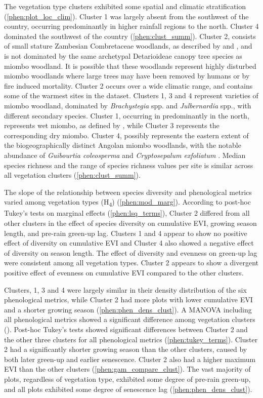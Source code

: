 \begin{refsection}
The \numberstringnum{\nCluster} vegetation type clusters exhibited some spatial and climatic stratification (\autoref{phen:plot_loc_clim}). Cluster 1 was largely absent from the southwest of the country, occurring predominantly in higher rainfall regions to the north. Cluster 4 dominated the southwest of the country (\autoref{phen:clust_summ}). Cluster 2, consists of small stature Zambesian Combretaceae woodlands, as described by \citet{Dinerstein2017} and \citet{Chidumayo2001}, and is not dominated by the same archetypal Detarioideae canopy tree species as miombo woodland. It is possible that these woodlands represent highly disturbed miombo woodlands where large trees may have been removed by humans or by fire induced mortality. Cluster 2 occurs over a wide climatic range, and contains some of the warmest sites in the dataset. Clusters 1, 3 and 4 represent varieties of miombo woodland, dominated by \textit{Brachystegia} spp. and \textit{Julbernardia} spp., with different secondary species. Cluster 1, occurring in predominantly in the north, represents wet miombo, as defined by \citet{White1983}, while Cluster 3 represents the corresponding dry miombo. Cluster 4, possibly represents the eastern extent of the biogeographically distinct Angolan miombo woodlands, with the notable abundance of \textit{Guibourtia coleosperma} and \textit{Cryptosepalum exfoliatum} \citep{Huntley1994}. Median species richness and the range of species richness values per site is similar across all vegetation clusters (\autoref{phen:clust_summ}). 

The slope of the relationship between species diversity and phenological metrics varied among vegetation types (H\textsubscript{4}) (\autoref{phen:mod_marg}). According to post-hoc Tukey's tests on marginal effects (\autoref{phen:lsq_terms}), Cluster 2 differed from all other clusters in the effect of species diversity on cumulative EVI, growing season length, and pre-rain green-up lag. Clusters 1 and 4 appear to show no positive effect of diversity on cumulative EVI and Cluster 4 also showed a negative effect of diversity on season length. The effect of diversity and evenness on green-up lag were consistent among all vegetation types. Cluster 2 appears to show a divergent positive effect of evenness on cumulative EVI compared to the other clusters. 
 
Clusters, 1, 3 and 4 were largely similar in their density distribution of the six phenological metrics, while Cluster 2 had more plots with lower cumulative EVI and a shorter growing season (\autoref{phen:phen_dens_clust}). A MANOVA including all phenological metrics showed a significant difference among vegetation clusters (\phenManova{}). Post-hoc Tukey's tests showed significant differences between Cluster 2 and the other three clusters for all phenological metrics (\autoref{phen:tukey_terms}). Cluster 2 had a significantly shorter growing season than the other clusters, caused by both later green-up and earlier senescence. Cluster 2 also had a higher maximum EVI than the other clusters (\autoref{phen:gam_compare_clust}). The vast majority of plots, regardless of vegetation type, exhibited some degree of pre-rain green-up, and all plots exhibited some degree of senescence lag (\autoref{phen:phen_dens_clust}).



\end{refsection}
